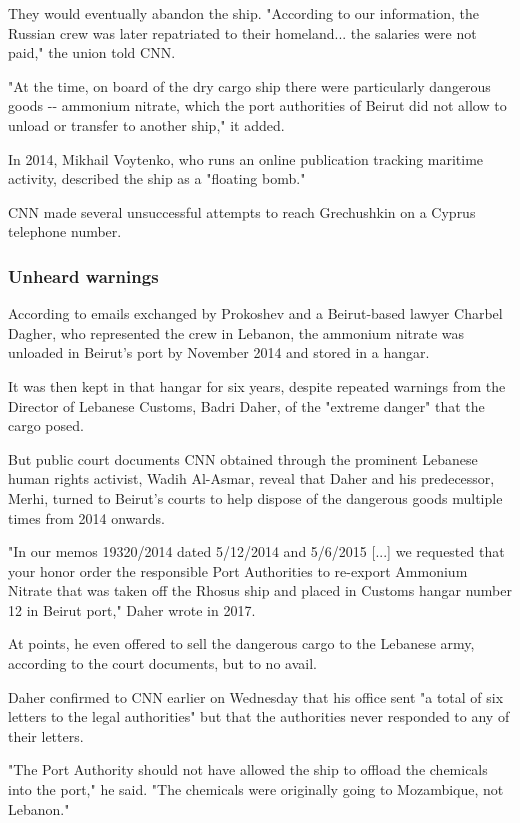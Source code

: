 They would eventually abandon the ship. "According to our information,
the Russian crew was later repatriated to their homeland... the salaries
were not paid," the union told CNN.

"At the time, on board of the dry cargo ship there were particularly
dangerous goods -\/- ammonium nitrate, which the port authorities of
Beirut did not allow to unload or transfer to another ship," it added.

In 2014, Mikhail Voytenko, who runs an online publication tracking
maritime activity, described the ship as a "floating bomb."

CNN made several unsuccessful attempts to reach Grechushkin on a Cyprus
telephone number.

\hypertarget{unheard-warnings}{%
\subsubsection{Unheard warnings}\label{unheard-warnings}}

According to emails exchanged by Prokoshev and a Beirut-based lawyer
Charbel Dagher, who represented the crew in Lebanon, the ammonium
nitrate was unloaded in Beirut's port by November 2014 and stored in a
hangar.

It was then kept in that hangar for six years, despite repeated warnings
from the Director of Lebanese Customs, Badri Daher, of the "extreme
danger" that the cargo posed.

But public court documents CNN obtained through the prominent Lebanese
human rights activist, Wadih Al-Asmar, reveal that Daher and his
predecessor, Merhi, turned to Beirut's courts to help dispose of the
dangerous goods multiple times from 2014 onwards.

"In our memos 19320/2014 dated 5/12/2014 and 5/6/2015 {[}...{]} we
requested that your honor order the responsible Port Authorities to
re-export Ammonium Nitrate that was taken off the Rhosus ship and placed
in Customs hangar number 12 in Beirut port," Daher wrote in 2017.

At points, he even offered to sell the dangerous cargo to the Lebanese
army, according to the court documents, but to no avail.

Daher confirmed to CNN earlier on Wednesday that his office sent "a
total of six letters to the legal authorities" but that the authorities
never responded to any of their letters.

"The Port Authority should not have allowed the ship to offload the
chemicals into the port," he said. "The chemicals were originally going
to Mozambique, not Lebanon."


